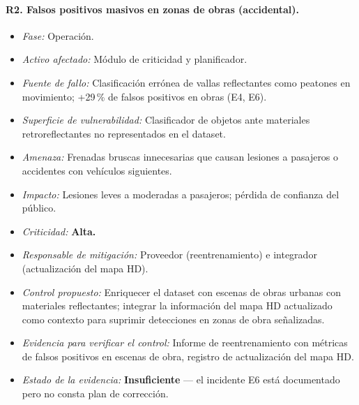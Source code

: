 \documentclass[11pt]{article}
\begin{document}
\paragraph{R2. Falsos positivos masivos en zonas de obras (accidental).}
\begin{itemize}[nosep]
    \item \textit{Fase:} Operación.
    \item \textit{Activo afectado:} Módulo de criticidad y planificador.
    \item \textit{Fuente de fallo:} Clasificación errónea de vallas reflectantes como peatones en movimiento; +29\,\% de falsos positivos en obras (E4, E6).
    \item \textit{Superficie de vulnerabilidad:} Clasificador de objetos ante materiales retroreflectantes no representados en el dataset.
    \item \textit{Amenaza:} Frenadas bruscas innecesarias que causan lesiones a pasajeros o accidentes con vehículos siguientes.
    \item \textit{Impacto:} Lesiones leves a moderadas a pasajeros; pérdida de confianza del público.
    \item \textit{Criticidad:} \textbf{Alta.}
    \item \textit{Responsable de mitigación:} Proveedor (reentrenamiento) e integrador (actualización del mapa HD).
    \item \textit{Control propuesto:} Enriquecer el dataset con escenas de obras urbanas con materiales reflectantes; integrar la información del mapa HD actualizado como contexto para suprimir detecciones en zonas de obra señalizadas.
    \item \textit{Evidencia para verificar el control:} Informe de reentrenamiento con métricas de falsos positivos en escenas de obra, registro de actualización del mapa HD.
    \item \textit{Estado de la evidencia:} \textbf{Insuficiente} --- el incidente E6 está documentado pero no consta plan de corrección.
\end{itemize}
\end{document}
